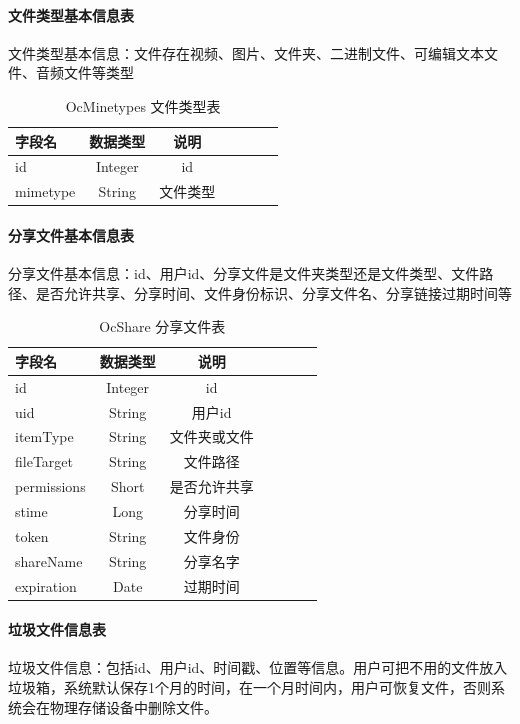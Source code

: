 \paragraph{文件类型基本信息表}
文件类型基本信息：文件存在视频、图片、文件夹、二进制文件、可编辑文本文件、音频文件等类型
\begin{table}[htbp]\center
\caption{OcMinetypes 文件类型表}
\begin{tabular}{lcccccl}
    \toprule
    字段名 & 数据类型 & 说明 \\
    \midrule
    id         & Integer  &  id        \\
    mimetype  & String  &  文件类型      \\

    \bottomrule
\end{tabular}
\label{type_table}   
\end{table}

\paragraph{分享文件基本信息表}
分享文件基本信息：id、用户id、分享文件是文件夹类型还是文件类型、文件路径、是否允许共享、分享时间、文件身份标识、分享文件名、分享链接过期时间等

\begin{table}[htbp]\center
\caption{OcShare 分享文件表}
\begin{tabular}{lcccccl}
    \toprule
    字段名 & 数据类型 & 说明 \\
    \midrule
    id          & Integer  &   id      \\
    uid         & String   &   用户id   \\
    itemType    & String   &   文件夹或文件    \\  
    fileTarget  & String   &   文件路径     \\
    permissions & Short    &   是否允许共享\\
    stime       & Long     &   分享时间  \\
    token       & String   &   文件身份 \\     
    shareName   & String   &   分享名字  \\    
    expiration  & Date     &   过期时间   \\
    \bottomrule 
\end{tabular}
\label{share_table}   
\end{table}

\paragraph{垃圾文件信息表}
垃圾文件信息：包括id、用户id、时间戳、位置等信息。用户可把不用的文件放入垃圾箱，系统默认保存1个月的时间，在一个月时间内，用户可恢复文件，否则系统会在物理存储设备中删除文件。

